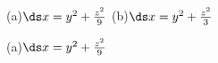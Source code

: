 {\begin{minipage}[m]{\linewidth}
\centering
{}

(a)\quad $\ds x=y^2+\frac{z^2}{9}$ \qquad\qquad (b)\quad $\ds x=y^2+\frac{z^2}{3}$
\end{minipage}
}
{(a)\quad $\ds x=y^2+\frac{z^2}{9}$
}

